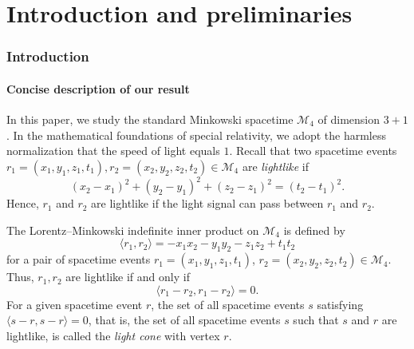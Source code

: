 \documentclass[10pt]{amsart}
\theoremstyle{definition}
\theoremstyle{remark}
\numberwithin{subsection}{section}
\numberwithin{equation}{section}
\begin{document}
\maketitle

\tableofcontents


%


%
%
%
%
%
%


\part{Introduction and preliminaries}

\section{Introduction}

\subsection{Concise description of our result}
In this paper, we study the standard Minkowski spacetime  $\mathcal{M}_4$  of dimension $3+1$.
In the mathematical foundations of special relativity, we adopt the harmless normalization that the speed of light equals $1$.
Recall that two spacetime events $r_1 = (x_1 , y_1 , z_1 , t_1), r_2 = (x_2, y_2, z_2 , t_2 ) \in \mathcal{M}_4$ are \emph{lightlike}  if
\[
(x_2 - x_1)^2 + (y_2 - y_1)^2 + (z_2 - z_1)^2 = (t_2 - t_1)^2 .
\]
Hence, $r_1$ and $r_2$ are lightlike if the light signal can pass between $r_1$ and $r_2$.


The Lorentz--Minkowski indefinite inner product  on $\mathcal{M}_4$ is defined by \index{$\langle\cdot, \cdot\rangle$}
\[
\langle r_1 , r_2 \rangle = -x_1 x_2 - y_1 y_2  -z_1 z_2  + t_1 t_2 
\]
for a pair of spacetime events $r_1 = (x_1 , y_1 , z_1 , t_1)$, $r_2 = (x_2, y_2, z_2 , t_2 ) \in \mathcal{M}_4$.
Thus, $r_1 , r_2$ are lightlike if and only if 
\[
\langle r_1 - r_2 , r_1 - r_2 \rangle = 0  .
\]
For a given spacetime event $r$, the set of all spacetime events $s$ satisfying $\langle s - r , s - r \rangle = 0$, that is, the set of all spacetime events $s$ such that $s$ and $r$ are lightlike,
is called the \emph{light cone}  with vertex $r$.
\end{document}
